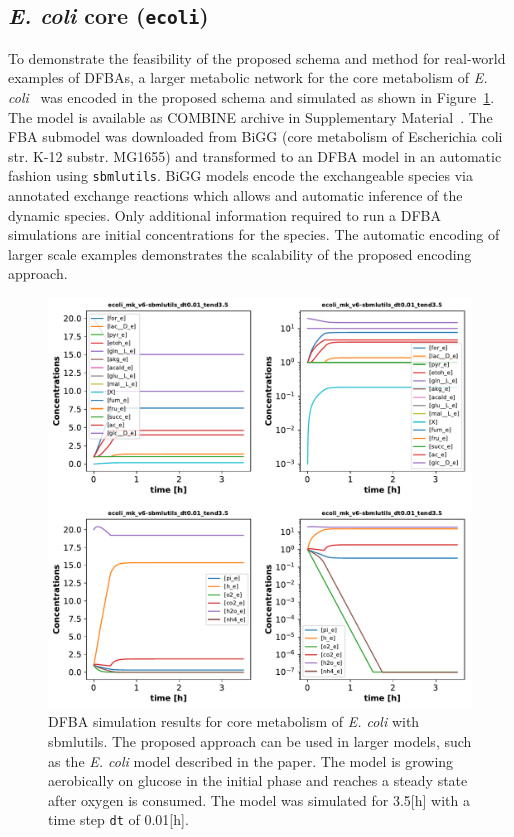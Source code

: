 \documentclass{bioinfo}
\begin{document}
\subsection{\emph{E. coli} core (\texttt{ecoli})}
To demonstrate the feasibility of the proposed schema and method for real-world examples of DFBAs, a larger metabolic network for the core metabolism of \emph{E. coli}~\citep{ecoli_core} was encoded in the proposed schema and simulated as shown in Figure~\ref{fig:ecoli}. The model is available as COMBINE archive in Supplementary Material~. The FBA submodel was downloaded from BiGG \citep{bigg} (core metabolism of Escherichia coli str. K-12 substr. MG1655) and transformed to an DFBA model in an automatic fashion using \texttt{sbmlutils}. BiGG models encode the exchangeable species via annotated exchange reactions which allows and automatic inference of the dynamic species. Only additional information required to run a DFBA simulations are initial concentrations for the species. The automatic encoding of larger scale examples demonstrates the scalability of the proposed encoding approach. 

\begin{figure}[!t]
	\centerline{\includegraphics[width=\linewidth]{figures/Fig6_ecoli_mk_v6-sbmlutils_dt0_01_tend3_5.pdf}}
	\caption{DFBA simulation results for core metabolism of \emph{E. coli} with sbmlutils. The proposed approach can be used in larger models, such as the \emph{E. coli} model described in the paper. The model is growing aerobically on glucose in the initial phase and reaches a steady state after oxygen is consumed. The model was simulated for 3.5[h] with a time step \texttt{dt} of 0.01[h].}\label{fig:ecoli}
\end{figure}
\end{document}
